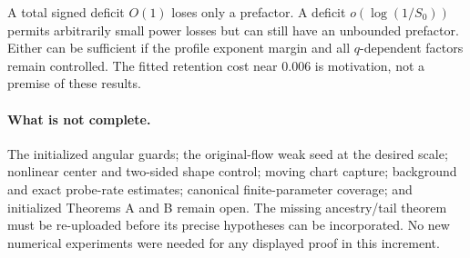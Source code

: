 \documentclass[11pt]{article}
\numberwithin{equation}{section}
\theoremstyle{remark}\newtheorem{remark}[theorem]{Remark}
\newcommand{\1}{\mathbf1}
\begin{document}
A total signed deficit $O(1)$ loses only a prefactor. A deficit
$o(\log(1/S_0))$ permits arbitrarily small power losses but can still have
an unbounded prefactor. Either can be sufficient if the profile exponent
margin and all $q$-dependent factors remain controlled. The fitted
retention cost near $0.006$ is motivation, not a premise of these results.

\paragraph{What is not complete.}
The initialized angular guards; the original-flow weak seed at the desired
scale; nonlinear center and two-sided shape control; moving chart capture;
background and exact probe-rate estimates; canonical finite-parameter
coverage; and initialized Theorems A and B remain open. The missing
ancestry/tail theorem must be re-uploaded before its precise hypotheses can
be incorporated. No new numerical experiments were needed for any displayed
proof in this increment.
\end{document}
